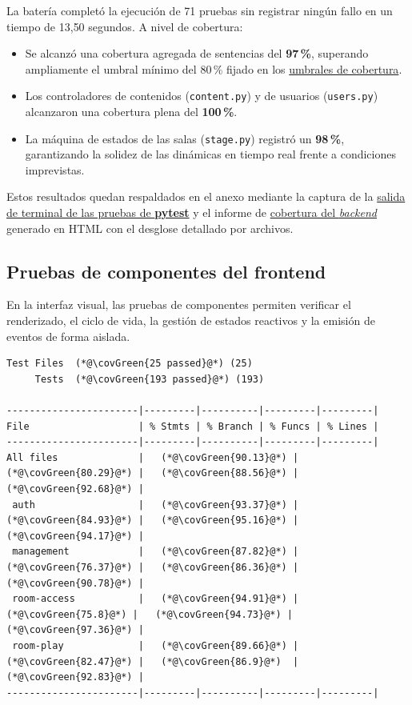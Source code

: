 La batería completó la ejecución de 71 pruebas sin registrar ningún fallo en un tiempo de 13{,}50 segundos. A nivel de cobertura:

\begin{itemize}
    \item Se alcanzó una cobertura agregada de sentencias del \textbf{97\,\%}, superando ampliamente el umbral mínimo del 80\,\% fijado en los \hyperref[tab:umbrales_cobertura]{umbrales de cobertura}.
    \item Los controladores de contenidos (\texttt{content.py}) y de usuarios (\texttt{users.py}) alcanzaron una cobertura plena del \textbf{100\,\%}.
    \item La máquina de estados de las salas (\texttt{stage.py}) registró un \textbf{98\,\%}, garantizando la solidez de las dinámicas en tiempo real frente a condiciones imprevistas.
\end{itemize}

Estos resultados quedan respaldados en el anexo mediante la captura de la \hyperref[ev:terminal_test_backend]{salida de terminal de las pruebas de \textbf{pytest}} y el informe de \hyperref[ev:cobertura_backend]{cobertura del \textit{backend}} generado en HTML con el desglose detallado por archivos.

\subsection{Pruebas de componentes del frontend}\label{sub:resultados_pruebas_frontend}

En la interfaz visual, las pruebas de componentes permiten verificar el renderizado, el ciclo de vida, la gestión de estados reactivos y la emisión de eventos de forma aislada.

\begin{evidence}[H]
\begin{lstlisting}
Test Files  (*@\covGreen{25 passed}@*) (25)
     Tests  (*@\covGreen{193 passed}@*) (193)

-----------------------|---------|----------|---------|---------|
File                   | % Stmts | % Branch | % Funcs | % Lines |
-----------------------|---------|----------|---------|---------|
All files              |   (*@\covGreen{90.13}@*) |    (*@\covGreen{80.29}@*) |   (*@\covGreen{88.56}@*) |   (*@\covGreen{92.68}@*) |
 auth                  |   (*@\covGreen{93.37}@*) |    (*@\covGreen{84.93}@*) |   (*@\covGreen{95.16}@*) |   (*@\covGreen{94.17}@*) |
 management            |   (*@\covGreen{87.82}@*) |    (*@\covGreen{76.37}@*) |   (*@\covGreen{86.36}@*) |   (*@\covGreen{90.78}@*) |
 room-access           |   (*@\covGreen{94.91}@*) |     (*@\covGreen{75.8}@*) |   (*@\covGreen{94.73}@*) |   (*@\covGreen{97.36}@*) |
 room-play             |   (*@\covGreen{89.66}@*) |    (*@\covGreen{82.47}@*) |   (*@\covGreen{86.9}@*)  |   (*@\covGreen{92.83}@*) |
-----------------------|---------|----------|---------|---------|
\end{lstlisting}
\caption{Resumen de pruebas y cobertura de componentes.}
\label{ev:resumen_componentes}
\end{evidence}

